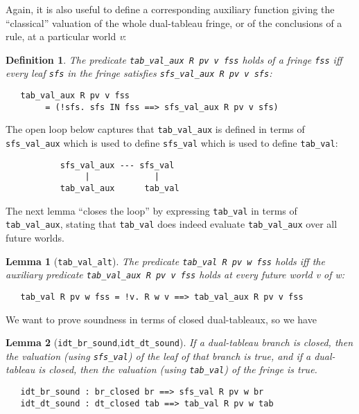 \documentclass[a4paper]{article}
\newtheorem{lemma}{Lemma}
\newtheorem{definition}{Definition}
\begin{document}
Again, it is also useful to define a corresponding auxiliary function
giving the ``classical'' valuation of the whole dual-tableau fringe,
or of the conclusions of a rule, at a particular world \textit{v}:
\begin{definition}
The predicate
\texttt{tab\_val\_aux R pv v fss}
holds of a fringe 
\texttt{fss}
iff every leaf
\texttt{sfs}
in the fringe satisfies
\texttt{sfs\_val\_aux R pv v sfs}:
\begin{verbatim}
   tab_val_aux R pv v fss 
        = (!sfs. sfs IN fss ==> sfs_val_aux R pv v sfs)
\end{verbatim}
\end{definition}

The open loop below captures that \texttt{tab\_val\_aux} is defined in
terms of \texttt{sfs\_val\_aux} which is used to define
\texttt{sfs\_val} which is used to define \texttt{tab\_val}:
\begin{verbatim}
           sfs_val_aux --- sfs_val
                |             |
           tab_val_aux      tab_val
\end{verbatim}
The next lemma ``closes the loop'' by expressing \texttt{tab\_val} in terms of
\texttt{tab\_val\_aux}, stating that \texttt{tab\_val} does indeed
evaluate \texttt{tab\_val\_aux} over all future worlds.

\begin{lemma}[\texttt{tab\_val\_alt}]
The predicate \texttt{tab\_val R pv w fss} holds iff 
the auxiliary predicate \texttt{tab\_val\_aux R pv v fss} holds at
every future world \textit{v} of \textit{w}:
\begin{verbatim}
   tab_val R pv w fss = !v. R w v ==> tab_val_aux R pv v fss
\end{verbatim}
\end{lemma}

We want to prove soundness in terms of closed dual-tableaux, so we have

\begin{lemma}[\texttt{idt\_br\_sound},\texttt{idt\_dt\_sound}]
\label{idt-br-sound} \label{idt-dt-sound}
  If a dual-tableau branch is closed, then the valuation (using
  \texttt{sfs\_val}) of the leaf of that branch is true, and if a
  dual-tableau is closed, then the valuation (using
  \texttt{tab\_val}) of the fringe is true.
\end{lemma}
\begin{verbatim}
   idt_br_sound : br_closed br ==> sfs_val R pv w br
   idt_dt_sound : dt_closed tab ==> tab_val R pv w tab
\end{verbatim}
\end{document}

